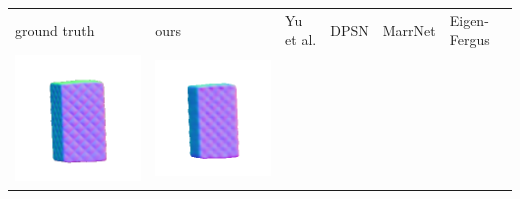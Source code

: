 \begin{tabularx}{\linewidth}{@{}Y@{}Y@{}Y@{}Y@{}Y@{}Y@{}}
ground truth & ours & Yu et al. & DPSN & MarrNet & Eigen-Fergus \\
\includegraphics[width=\linewidth]{semisynthetic/20150514_18_gt.png} &
\includegraphics[width=\linewidth]{semisynthetic/20150514_18_ours_out.png} &

\end{tabularx}
